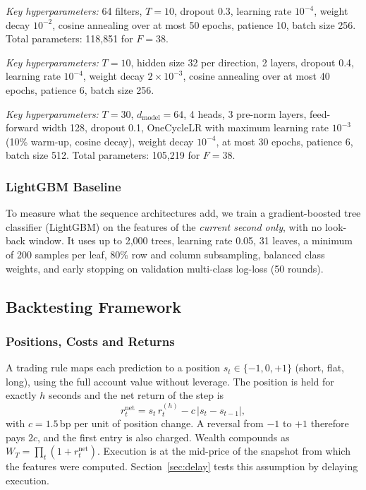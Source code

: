 \emph{Key hyperparameters:} 64 filters, $T=10$, dropout 0.3, learning rate $10^{-4}$, weight
decay $10^{-2}$, cosine annealing over at most 50 epochs, patience 10, batch size 256.
Total parameters: 118,851 for $F=38$.

\emph{Key hyperparameters:} $T=10$, hidden size 32 per direction, 2 layers, dropout 0.4,
learning rate $10^{-4}$, weight decay $2\times10^{-3}$, cosine annealing over at most
40 epochs, patience 6, batch size 256.

\emph{Key hyperparameters:} $T=30$, $d_{\text{model}}=64$, 4 heads, 3 pre-norm layers,
feed-forward width 128, dropout 0.1, OneCycleLR with maximum learning rate $10^{-3}$
(10\% warm-up, cosine decay), weight decay $10^{-4}$, at most 30 epochs, patience 6,
batch size 512. Total parameters: 105,219 for $F=38$.

\subsubsection{LightGBM Baseline}
To measure what the sequence architectures add, we train a gradient-boosted tree
classifier (LightGBM) on the features of the \emph{current second only}, with no look-back
window. It uses up to 2,000 trees, learning rate 0.05, 31 leaves, a minimum of 200
samples per leaf, 80\% row and column subsampling, balanced class weights, and early
stopping on validation multi-class log-loss (50 rounds).


\subsection{Backtesting Framework}
\label{sec:backtest}

\subsubsection{Positions, Costs and Returns}
A trading rule maps each prediction to a position $s_t \in \{-1, 0, +1\}$ (short, flat,
long), using the full account value without leverage. The position is held for exactly $h$
seconds and the net return of the step is
\begin{equation}
  r^{\text{net}}_t = s_t\, r^{(h)}_t - c\,|s_t - s_{t-1}|,
  \label{eq:netret}
\end{equation}
with $c = 1.5$\,bp per unit of position change. A reversal from $-1$ to $+1$ therefore pays
$2c$, and the first entry is also charged. Wealth compounds as
$W_T = \prod_t (1 + r^{\text{net}}_t)$. Execution is at the mid-price of the snapshot
from which the features were computed. Section~\ref{sec:delay} tests this assumption by
delaying execution.


